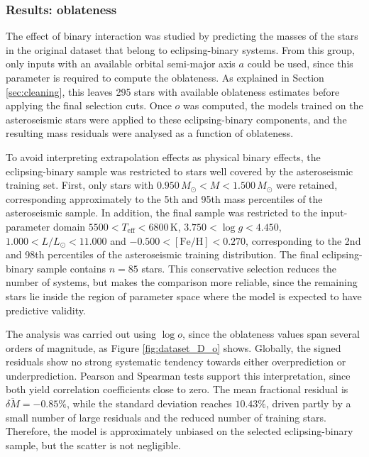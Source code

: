 \subsubsection*{Results: oblateness}
The effect of binary interaction was studied by predicting the masses of the stars in the original dataset that belong to eclipsing-binary systems. From this group, only inputs with an available orbital semi-major axis $a$ could be used, since this parameter is required to compute the oblateness. As explained in Section \ref{sec:cleaning}, this leaves 295 stars with available oblateness estimates before applying the final selection cuts. Once $o$ was computed, the models trained on the asteroseismic stars were applied to these eclipsing-binary components, and the resulting mass residuals were analysed as a function of oblateness.

To avoid interpreting extrapolation effects as physical binary effects, the eclipsing-binary sample was restricted to stars well covered by the asteroseismic training set. First, only stars with $0.950\,M_\odot < M < 1.500\,M_\odot$ were retained, corresponding approximately to the 5th and 95th mass percentiles of the asteroseismic sample. In addition, the final sample was restricted to the input-parameter domain $5500 < T_{\mathrm{eff}} < 6800\,\mathrm{K}$, $3.750 < \log g < 4.450$, $1.000 < L/L_\odot < 11.000$ and $-0.500 < [\mathrm{Fe}/\mathrm{H}] < 0.270$, corresponding to the 2nd and 98th percentiles of the asteroseismic training distribution. The final eclipsing-binary sample contains $n=85$ stars. This conservative selection reduces the number of systems, but makes the comparison more reliable, since the remaining stars lie inside the region of parameter space where the model is expected to have predictive validity.

The analysis was carried out using $\log o$, since the oblateness values span several orders of magnitude, as Figure \ref{fig:dataset_D_o} shows. Globally, the signed residuals show no strong systematic tendency towards either overprediction or underprediction. Pearson and Spearman tests support this interpretation, since both yield correlation coefficients close to zero. The mean fractional residual is $\overline{\delta M}=-0.85\%$, while the standard deviation reaches $10.43\%$, driven partly by a small number of large residuals and the reduced number of training stars. Therefore, the model is approximately unbiased on the selected eclipsing-binary sample, but the scatter is not negligible.

